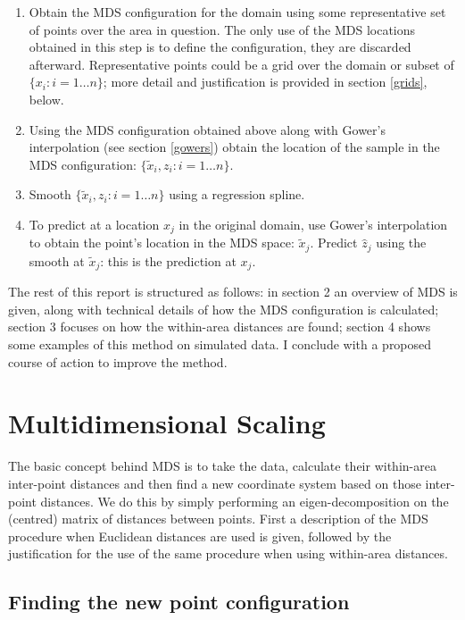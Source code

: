 \documentclass[a4paper,10pt]{article}
\begin{document}
\begin{enumerate}
\item Obtain the MDS configuration for the domain using some representative set of points over the area in question. The only use of the MDS locations obtained in this step is to define the configuration, they are discarded afterward. Representative points could be a grid over the domain or subset of $\{x_i : i=1\dots n\}$; more detail and justification is provided in section \ref{grids}, below.

\item Using the MDS configuration obtained above along with Gower's interpolation (see section \ref{gowers}) obtain the location of the sample in the MDS configuration: $\{\tilde{x}_i, z_i : i=1\dots n\}$.

\item Smooth $\{\tilde{x}_i, z_i : i=1\dots n\}$ using a regression spline.

\item To predict at a location $x_j$ in the original domain, use Gower's interpolation to 
obtain the point's location in the MDS space: $\tilde{x}_j$. Predict $\hat{z}_j$ using the smooth at $\tilde{x}_j$: this is the prediction at $x_j$.
\end{enumerate}

The rest of this report is structured as follows: in section 2 an overview of MDS is given, along with technical details of how the MDS configuration is calculated; section 3 focuses on how the within-area distances are found; section 4 shows some examples of this method on simulated data. I conclude with a proposed course of action to improve the method.

\section{Multidimensional Scaling}

The basic concept behind MDS is to take the data, calculate their within-area inter-point distances and then find a new coordinate system based on those inter-point distances. We do this by simply performing an eigen-decomposition on the (centred) matrix of distances between points. First a description of the MDS procedure when Euclidean distances are used is given, followed by the justification for the use of the same procedure when using within-area distances.

\subsection{Finding the new point configuration}
\end{document}

